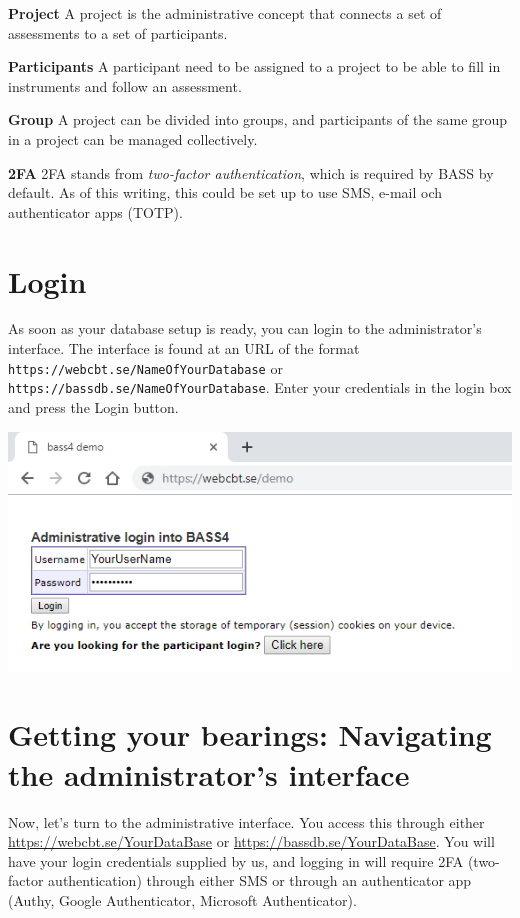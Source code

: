 \documentclass[]{book}
\begin{document}
\textbf{Project}
A project is the administrative concept that connects a set of assessments to a set of participants.

\textbf{Participants}
A participant need to be assigned to a project to be able to fill in instruments and follow an assessment.

\textbf{Group}
A project can be divided into groups, and participants of the same group in a project can be managed collectively.

\textbf{2FA}
2FA stands from \emph{two-factor authentication}, which is required by BASS by default. As of this writing, this could be set up to use SMS, e-mail och authenticator apps (TOTP).

\hypertarget{login}{%
\chapter{Login}\label{login}}

As soon as your database setup is ready, you can login to the administrator's interface. The interface is found at an URL of the format \texttt{https://webcbt.se/NameOfYourDatabase} or \texttt{https://bassdb.se/NameOfYourDatabase}. Enter your credentials in the login box and press the Login button.

\includegraphics{images/login.png}

\hypertarget{getting-your-bearings-navigating-the-administrators-interface}{%
\chapter{Getting your bearings: Navigating the administrator's interface}\label{getting-your-bearings-navigating-the-administrators-interface}}

Now, let's turn to the administrative interface. You access this through either \url{https://webcbt.se/YourDataBase} or \url{https://bassdb.se/YourDataBase}. You will have your login credentials supplied by us, and logging in will require 2FA (two-factor authentication) through either SMS or through an authenticator app (Authy, Google Authenticator, Microsoft Authenticator).
\end{document}
